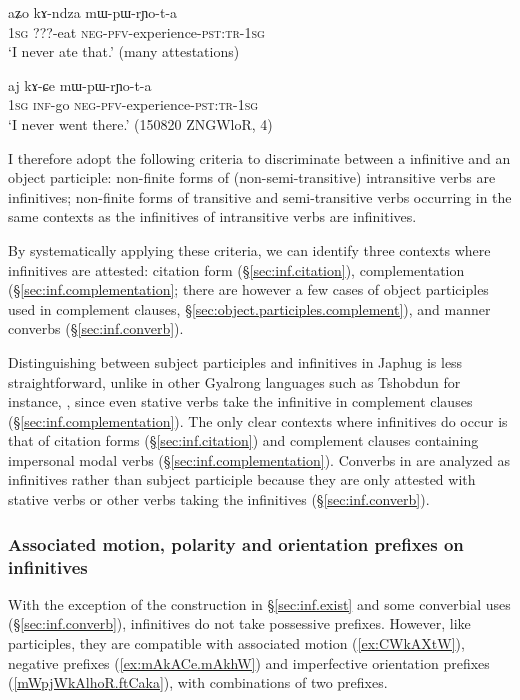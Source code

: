 \begin{exe}
\ex \label{ex:kAndza.mWpWrYota}
\gll aʑo kɤ-ndza mɯ-pɯ-rɲo-t-a \\
\textsc{1sg} ???-eat \textsc{neg}-\textsc{pfv}-experience-\textsc{pst}:\textsc{tr}-\textsc{1sg} \\
\glt `I never ate that.' (many attestations)
\end{exe}

\begin{exe}
\ex \label{ex:kACe.mWpWrYota}
\gll  aj kɤ-ɕe mɯ-pɯ-rɲo-t-a \\
\textsc{1sg} \textsc{inf}-go \textsc{neg}-\textsc{pfv}-experience-\textsc{pst}:\textsc{tr}-\textsc{1sg}  \\
\glt `I never went there.' (150820 ZNGWloR, 4)
\end{exe}

I therefore adopt the following criteria to discriminate between a  infinitive and an object participle:   non-finite forms of (non-semi-transitive) intransitive verbs are infinitives;  non-finite forms of transitive and semi-transitive verbs occurring in the same contexts as the infinitives of intransitive verbs are infinitives.

By systematically applying these criteria, we can identify three contexts where infinitives are attested: citation form (§\ref{sec:inf.citation}), complementation (§\ref{sec:inf.complementation}; there are however a few cases of object participles used in complement clauses, §\ref{sec:object.participles.complement}), and manner converbs (§\ref{sec:inf.converb}). 

Distinguishing between subject participles and  infinitives in Japhug is less straightforward, unlike in other Gyalrong languages such as Tshobdun for instance, \citealt{jackson14morpho}, since even stative verbs take the  infinitive in complement clauses (§\ref{sec:inf.complementation}). The only clear contexts where  infinitives do occur is that of citation forms (§\ref{sec:inf.citation}) and complement clauses containing impersonal modal verbs (§\ref{sec:inf.complementation}). Converbs in  are analyzed as infinitives rather than subject participle because they are only attested with stative verbs or other verbs taking the  infinitives (§\ref{sec:inf.converb}).
 
\subsubsection{Associated motion, polarity and orientation prefixes on infinitives}  \label{sec:infinitives.other.prefixes}
With the exception of the construction in §\ref{sec:inf.exist} and some converbial uses (§\ref{sec:inf.converb}),  infinitives do not take possessive prefixes. However, like participles, they are compatible with associated motion (\ref{ex:CWkAXtW}), negative prefixes (\ref{ex:mAkACe.mAkhW}) and imperfective orientation prefixes (\ref{mWpjWkAlhoR.ftCaka}), with combinations of two prefixes.

